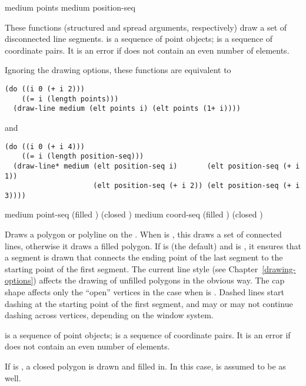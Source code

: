   {medium points \key \DrawingOptions \LineCapOptions}
 {medium position-seq \key \DrawingOptions \LineCapOptions}

These functions (structured and spread arguments, respectively) draw a set of
disconnected line segments.   is a sequence of point objects;
 is a sequence of coordinate pairs.  It is an error if
 does not contain an even number of elements.

Ignoring the drawing options, these functions are equivalent to
\begin{verbatim}
(do ((i 0 (+ i 2)))
    ((= i (length points)))
  (draw-line medium (elt points i) (elt points (1+ i))))
\end{verbatim}
and
\begin{verbatim}
(do ((i 0 (+ i 4)))
    ((= i (length position-seq)))
  (draw-line* medium (elt position-seq i)       (elt position-seq (+ i 1))
                     (elt position-seq (+ i 2)) (elt position-seq (+ i 3))))
\end{verbatim}


  {medium point-seq \key (filled ) (closed )
                        \DrawingOptions  \LineJointCapOptions}
 {medium coord-seq \key (filled ) (closed ) 
                        \DrawingOptions \LineJointCapOptions}

Draws a polygon or polyline on the  .  When
 is , this draws a set of connected lines, otherwise it
draws a filled polygon.  If  is  (the default) and
 is , it ensures that a segment is drawn that connects
the ending point of the last segment to the starting point of the first segment.
The current line style (see Chapter~\ref{drawing-options}) affects the drawing
of unfilled polygons in the obvious way.  The cap shape affects only the
``open'' vertices in the case when  is .  Dashed lines
start dashing at the starting point of the first segment, and may or may not
continue dashing across vertices, depending on the window system.

 is a sequence of point objects;  is a sequence of
coordinate pairs.  It is an error if  does not contain an even
number of elements.

If  is , a closed polygon is drawn and filled in.  In
this case,  is assumed to be  as well.


